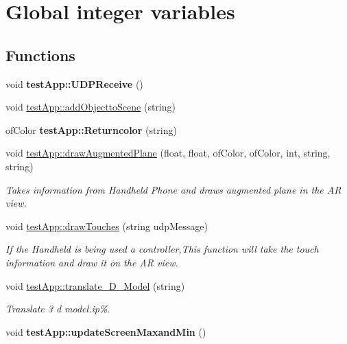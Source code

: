 \hypertarget{group___int_variables}{\section{Global integer variables}
\label{group___int_variables}
}
\subsection*{Functions}
\begin{DoxyCompactItemize}
\item 
\hypertarget{group___int_variables_gae18e12d5025a2167ebd63ca019468cc0}{void {\bfseries test\-App\-::\-U\-D\-P\-Receive} ()}\label{group___int_variables_gae18e12d5025a2167ebd63ca019468cc0}

\item 
void \hyperlink{group___int_variables_gaa1d58aa9130d8d7526eb407f13f7a833}{test\-App\-::add\-Objectto\-Scene} (string)
\item 
\hypertarget{group___int_variables_ga689f3b0cf0b38217152da7f5ce0d609f}{of\-Color {\bfseries test\-App\-::\-Returncolor} (string)}\label{group___int_variables_ga689f3b0cf0b38217152da7f5ce0d609f}

\item 
void \hyperlink{group___int_variables_ga34646de458b0af33bc02457c9b8583df}{test\-App\-::draw\-Augmented\-Plane} (float, float, of\-Color, of\-Color, int, string, string)
\begin{DoxyCompactList}\small\item\em Takes information from Handheld Phone and draws augmented plane in the A\-R view. \end{DoxyCompactList}\item 
void \hyperlink{group___int_variables_ga16036c3aa23c1747e315a3e18105cf45}{test\-App\-::draw\-Touches} (string udp\-Message)
\begin{DoxyCompactList}\small\item\em If the Handheld is being used a controller,This function will take the touch information and draw it on the A\-R view. \end{DoxyCompactList}\item 
void \hyperlink{group___int_variables_gae9ee24f0c2bec5965519deef1a14da16}{test\-App\-::translate\-\_\-D\-\_\-\-Model} (string)
\begin{DoxyCompactList}\small\item\em Translate 3 d model.ip\%. \end{DoxyCompactList}\item 
\hypertarget{group___int_variables_ga4dda4fecd7ea8748c4f712c1f5d13987}{void {\bfseries test\-App\-::update\-Screen\-Maxand\-Min} ()}\label{group___int_variables_ga4dda4fecd7ea8748c4f712c1f5d13987}


\end{DoxyCompactItemize}
